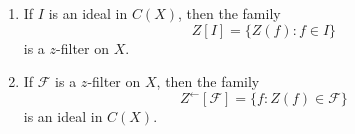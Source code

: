 \begin{enumerate}
\item[(a)] If $I$ is an ideal in $C(X)$, then the family
$$Z[I] = \{Z(f): f \in I\}$$
is a $z$-filter on $X$.
\item[(b)] If $\mathcal{F}$ is a $z$-filter on $X$, then the family
$$Z^{\leftarrow}[\mathcal{F}] = \{f: Z(f) \in \mathcal{F}\}$$
is an ideal in $C(X)$.
\end{enumerate}
